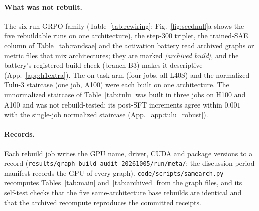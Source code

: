 \documentclass{article}
\begin{document}
\paragraph{What was not rebuilt.} The six-run GRPO family (Table~\ref{tab:rewiring}; Fig.~\ref{fig:seednull}a shows the five rebuildable runs on one architecture), the step-$300$ triplet, the trained-SAE column of Table~\ref{tab:randsae} and the activation battery read archived graphs or metric files that mix architectures; they are marked \emph{[archived build]}, and the battery's registered build check (branch B3) makes it descriptive (App.~\ref{app:h1extra}). The on-task arm (four jobs, all L40S) and the normalized Tulu-3 staircase (one job, A100) were each built on one architecture. The unnormalized staircase of Table~\ref{tab:tulu} was built in three jobs on H100 and A100 and was not rebuild-tested; its post-SFT increments agree within $0.001$ with the single-job normalized staircase (App.~\ref{app:tulu_robust}).

\paragraph{Records.} Each rebuild job writes the GPU name, driver, CUDA and package versions to a record (\texttt{results/graph\_build\_audit\_20261005/run/meta/}; the discussion-period manifest records the GPU of every graph). \texttt{code/scripts/samearch.py} recomputes Tables~\ref{tab:main} and~\ref{tab:archived} from the graph files, and its self-test checks that the five same-architecture base rebuilds are identical and that the archived recompute reproduces the committed receipts.
\end{document}
